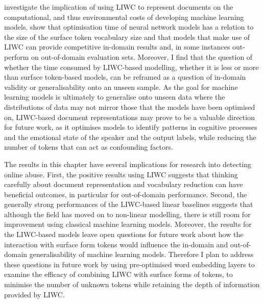  investigate the implication of using LIWC to represent documents on the computational, and thus environmental costs of developing machine learning models.
 show that optimisation time of neural network models has a relation to the size of the surface token vocabulary size and that models that make use of LIWC can provide competitive in-domain results and, in some instances out-perform on out-of-domain evaluation sets.
Moreover, I find that the question of whether the time consumed by LIWC-based modelling, whether it is less or more than surface token-based models, can be reframed as a question of in-domain validity or generalisability onto an unseen sample.
As the goal for machine learning models is ultimately to generalise onto unseen data where the distributions of data may not mirror those that the models have been optimised on, LIWC-based document representations may prove to be a valuable direction for future work, as it optimises models to identify patterns in cognitive processes and the emotional state of the speaker and the output labels, while reducing the number of tokens that can act as confounding factors.

The results in this chapter have several implications for research into detecting online abuse.
First, the positive results using LIWC suggests that thinking carefully about document representation and vocabulary reduction can have beneficial outcomes, in particular for out-of-domain performance.
Second, the generally strong performances of the LIWC-based linear baselines suggests that although the field has moved on to non-linear modelling, there is still room for improvement using classical machine learning models.
Moreover, the results for the LIWC-based models leave open questions for future work about how the interaction with surface form tokens would influence the in-domain and out-of-domain generalisability of machine learning models.
Therefore I plan to address these questions in future work by using pre-optimised word embedding layers to examine the efficacy of combining LIWC with surface forms of tokens, to minimise the number of unknown tokens while retaining the depth of information provided by LIWC.

